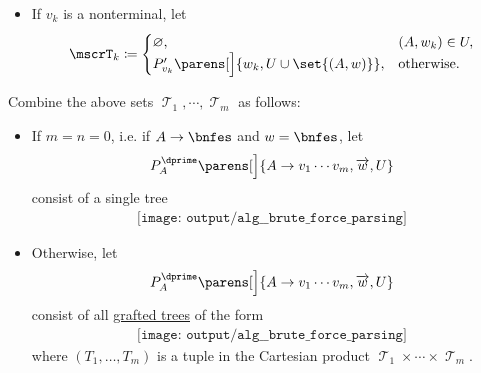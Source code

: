 \begin{algorithm}
\begin{thmenum}
\begin{itemize}
      \item If \( v_k \) is a nonterminal, let
      \begin{equation*}
        \mscrT_k \coloneqq \begin{cases}
          \varnothing,                                         &(A, w_k) \in U, \\
          P'_{v_k}\parens[\Big]{ w_k, U \cup \set{ (A, w) } }, &\T{otherwise.}
        \end{cases}
      \end{equation*}
    \end{itemize}

     Combine the above sets \( \mscrT_1, \cdots, \mscrT_m \) as follows:
    \begin{itemize}
      \item If \( m = n = 0 \), i.e. if \( A \to \bnfes \) and \( w = \bnfes \), let
      \begin{equation*}
        P^\dprime_A\parens[\Big]{ A \to v_1 \cdots v_m, \vect w, U }
      \end{equation*}
      consist of a single tree
      \begin{equation*}
        \begin{aligned}
          \texttt{[image: output/alg\_\_brute\_force\_parsing]}
        \end{aligned}
      \end{equation*}

      \item Otherwise, let
      \begin{equation*}
        P^\dprime_A\parens[\Big]{ A \to v_1 \cdots v_m, \vect w, U }
      \end{equation*}
      consist of all \hyperref[def:ordered_tree_grafting_product]{grafted trees} of the form
      \begin{equation*}
        \begin{aligned}
          \texttt{[image: output/alg\_\_brute\_force\_parsing]}
        \end{aligned}
      \end{equation*}
      where \( (T_1, \ldots, T_m) \) is a tuple in the Cartesian product \( \mscrT_1 \times \cdots \times \mscrT_m \).
    \end{itemize}
  \end{thmenum}
\end{algorithm}
